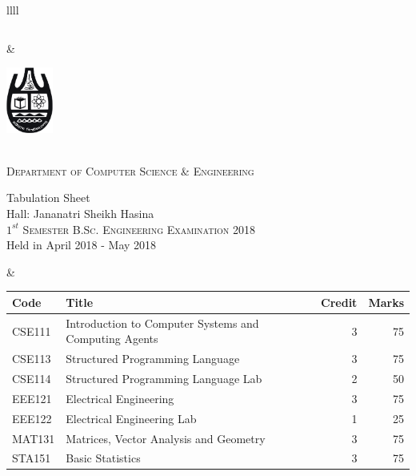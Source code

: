 \documentclass[11pt]{article}
\begin{document}
\begin{table}[ht]
\begin{tabularx}{\linewidth}{llll}
\begin{minipage}[m]{0.3\linewidth}
\begin{small}
{\begin{tabular}{ |c|}
			\end{tabular}
		}
	\end{small}
\end{minipage}

&
     \hspace{-5in}
\begin{minipage}[m]{0.35\textwidth} \centering
\includegraphics[width=0.6in]{cu-logo.jpg}
	
	\smallskip
	
	\\
	\textsc{Department of Computer Science \& Engineering}\\
	
	\smallskip
	
	{\large {\sc Tabulation Sheet}}\\
	{\large {\sc Hall: Jananatri Sheikh Hasina}}\\
	
	\smallskip
	\textsc{$1^{st}$ Semester B.Sc. Engineering Examination 2018}\\
	{Held in April 2018 - May 2018}\\
\end{minipage}
&
\hspace{1cm}
\begin{minipage}[m]{0.3\linewidth} \flushright
	\hspace{-5cm}
	\begin{small}
		\renewcommand{\arraystretch}{1.01}
		\begin{tabular} {|l|l|r|r|}
			\hline \hline Code & Title  & Credit &  Marks \\ \hline
\hline  CSE111 & Introduction to Computer Systems and Computing Agents & 3 & 75  \\
\hline  CSE113 & Structured Programming Language & 3 & 75  \\
\hline  CSE114 & Structured Programming Language Lab & 2 & 50  \\
\hline  EEE121 & Electrical Engineering & 3 & 75  \\
\hline  EEE122 & Electrical Engineering Lab & 1 & 25  \\
\hline  MAT131 & Matrices, Vector Analysis and Geometry & 3 & 75  \\
\hline  STA151 & Basic Statistics & 3 & 75  \\
 \hline
		\end{tabular}
	\end{small} 
\end{minipage}


\end{tabularx}
\end{table}
\end{document}
